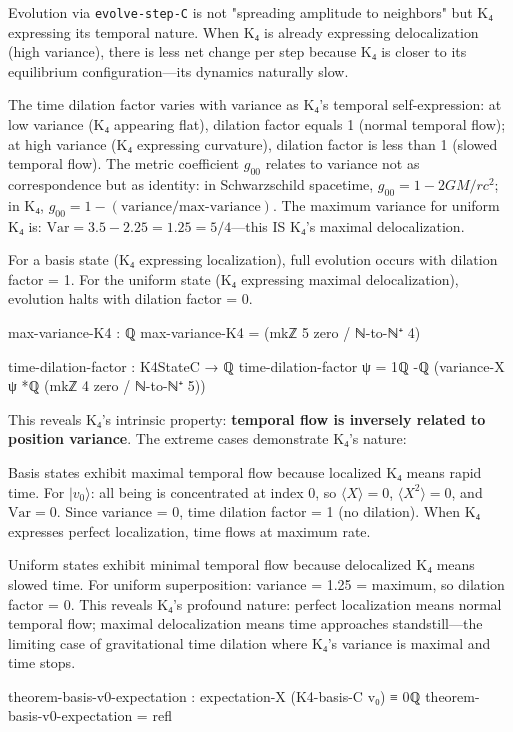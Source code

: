 \documentclass[11pt,a4paper]{book}
\begin{document}
Evolution via \texttt{evolve-step-C} is not "spreading amplitude to neighbors" but K₄ expressing its temporal nature. When K₄ is already expressing delocalization (high variance), there is less net change per step because K₄ is closer to its equilibrium configuration—its dynamics naturally slow.

The time dilation factor varies with variance as K₄'s temporal self-expression: at low variance (K₄ appearing flat), dilation factor equals 1 (normal temporal flow); at high variance (K₄ expressing curvature), dilation factor is less than 1 (slowed temporal flow). The metric coefficient $g_{00}$ relates to variance not as correspondence but as identity: in Schwarzschild spacetime, $g_{00} = 1 - 2GM/rc^2$; in K₄, $g_{00} = 1 - (\text{variance}/\text{max-variance})$. The maximum variance for uniform K₄ is: $\text{Var} = 3.5 - 2.25 = 1.25 = 5/4$—this IS K₄'s maximal delocalization.

For a basis state (K₄ expressing localization), full evolution occurs with dilation factor = 1. For the uniform state (K₄ expressing maximal delocalization), evolution halts with dilation factor = 0.

\begin{code}
max-variance-K4 : ℚ
max-variance-K4 = (mkℤ 5 zero / ℕ-to-ℕ⁺ 4)

time-dilation-factor : K4StateC → ℚ
time-dilation-factor ψ = 1ℚ -ℚ (variance-X ψ *ℚ (mkℤ 4 zero / ℕ-to-ℕ⁺ 5))
\end{code}

This reveals K₄'s intrinsic property: \textbf{temporal flow is inversely related to position variance}. The extreme cases demonstrate K₄'s nature:

Basis states exhibit maximal temporal flow because localized K₄ means rapid time. For $|v_0\rangle$: all being is concentrated at index 0, so $\langle X\rangle = 0$, $\langle X^2\rangle = 0$, and $\text{Var} = 0$. Since variance = 0, time dilation factor = 1 (no dilation). When K₄ expresses perfect localization, time flows at maximum rate.

Uniform states exhibit minimal temporal flow because delocalized K₄ means slowed time. For uniform superposition: variance = 1.25 = maximum, so dilation factor = 0. This reveals K₄'s profound nature: perfect localization means normal temporal flow; maximal delocalization means time approaches standstill—the limiting case of gravitational time dilation where K₄'s variance is maximal and time stops.

\begin{code}
theorem-basis-v0-expectation : expectation-X (K4-basis-C v₀) ≡ 0ℚ
theorem-basis-v0-expectation = refl
\end{code}
\end{document}
